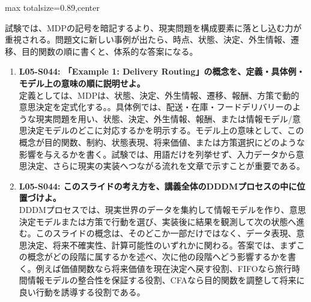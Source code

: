 \begin{minipage}[t]{0.58\textwidth}
\begin{adjustbox}{max totalsize={\textwidth}{0.89\textheight},center}
\begin{minipage}{\textwidth}
試験では、MDPの記号を暗記するより、現実問題を構成要素に落とし込む力が重視される。問題文に新しい事例が出たら、時点、状態、決定、外生情報、遷移、目的関数の順に書くと、体系的な答案になる。\par{}\begin{enumerate}\item \textbf{L05-S044: 「Example 1: Delivery Routing」の概念を、定義・具体例・モデル上の意味の順に説明せよ。}\\定義としては、MDPは、状態、決定、外生情報、遷移、報酬、方策で動的意思決定を定式化する。。具体例では、配送・在庫・フードデリバリーのような現実問題を用い、状態、決定、外生情報、報酬、または情報モデル/意思決定モデルのどこに対応するかを明示する。モデル上の意味として、この概念が目的関数、制約、状態表現、将来価値、または方策選択にどのような影響を与えるかを書く。試験では、用語だけを列挙せず、入力データから意思決定、さらに現実の実装へつながる流れを文章で示すことが重要である。\item \textbf{L05-S044: このスライドの考え方を、講義全体のDDDMプロセスの中に位置づけよ。}\\DDDMプロセスでは、現実世界のデータを集約して情報モデルを作り、意思決定モデルまたは方策で行動を選び、実装後に結果を観測して次の状態へ進む。このスライドの概念は、そのどこか一部だけではなく、データ表現、意思決定、将来不確実性、計算可能性のいずれかに関わる。答案では、まずこの概念がどの段階に属するかを述べ、次に他の段階へどう影響するかを書く。例えば価値関数なら将来価値を現在決定へ戻す役割、FIFOなら旅行時間情報モデルの整合性を保証する役割、CFAなら目的関数を調整して将来に良い行動を誘導する役割である。\end{enumerate}
\end{minipage}
\end{adjustbox}
\end{minipage}


